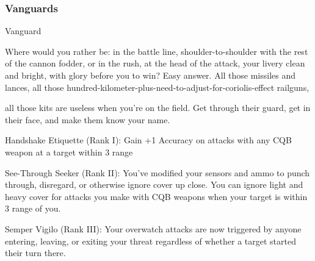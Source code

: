 \subsubsection{Vanguards}
                                                   Vanguard

Where would you rather be: in the battle line, shoulder-to-shoulder with the rest of the cannon fodder, or in
the rush, at the head of the attack, your livery clean and bright, with glory before you to win? Easy answer.
All those missiles and lances, all those hundred-kilometer-plus-need-to-adjust-for-coriolis-effect railguns,

all those kits are useless when you’re on the field. Get through their guard, get in their face, and make them
know your name.

Handshake Etiquette (Rank I): Gain +1 Accuracy on attacks with any CQB weapon at a target
within 3 range

See-Through Seeker (Rank II): You’ve modified your sensors and ammo to punch through,
disregard, or otherwise ignore cover up close. You can ignore light and heavy cover for attacks
you make with CQB weapons when your target is within 3 range of you.

Semper Vigilo (Rank III): Your overwatch attacks are now triggered by anyone entering, leaving,
or exiting your threat regardless of whether a target started their turn there.